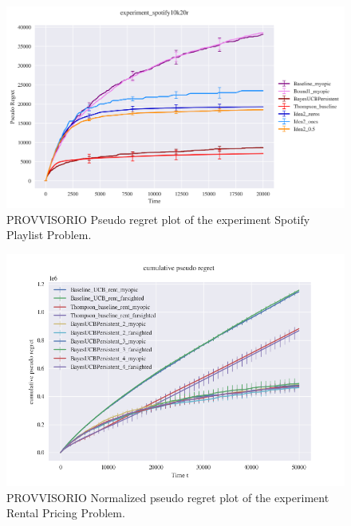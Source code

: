 


\begin{figure}[H]
	\includegraphics[width=16cm]{./images/provvisori/experiment_spotify10k20r ANALYTICS.png}
	\centering	
	\caption{PROVVISORIO Pseudo regret plot of the experiment Spotify Playlist Problem.}
\end{figure}


\begin{figure}[H]
	\centering
	\includegraphics[width=16cm]{./images/provvisori/RENT_provvisorio.png}
		
	\caption{PROVVISORIO Normalized pseudo regret plot of the experiment Rental Pricing Problem.}
\end{figure}




